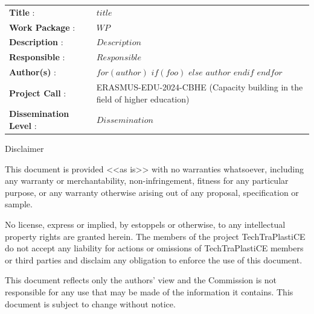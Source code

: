 \vfill


\begin{tabu} to \linewidth {X[1,l]  | X[3.5,l]}
  \toprule
  \textbf{Title} : & $title$  \\ 
  \textbf{Work Package} : & $WP$  \\ 
  \textbf{Description} : & $Description$  \\ 
  \textbf{Responsible} : & $Responsible$  \\ 
  \textbf{Author(s)} : &  
  $for(author)$ 
    $if(foo)$
    \newline
    $else$
    $author$
    $endif$
   $endfor$  \\ 
  \textbf{Project Call} : & ERASMUS-EDU-2024-CBHE (Capacity building in the field of higher education)  \\ 
  \textbf{Dissemination Level} : & $Dissemination$\\   
\bottomrule
\end{tabu}



\vfill




  
  
  \vfill
  
  {\scriptsize\centering\color{lightgray} 
  
  Disclaimer
  
  This document is provided <<as is>> with no warranties whatsoever, 
  including any warranty or merchantability, non-infringement, fitness for any particular 
  purpose, or any warranty otherwise arising out of any proposal, specification or sample.  
  
  No license, express or implied, by estoppels or otherwise, to any intellectual 
  property rights are granted herein. 
  The members of the project TechTraPlastiCE do not accept any liability for actions or 
  omissions of TechTraPlastiCE members or third parties and disclaim any obligation 
  to enforce the use of this document. 
  
  This document reflects only the authors' view and the Commission is not responsible 
  for any use that may be made of the information it contains.  
  This document is subject to change without notice. 
  
  }
  \normalsize
  
  
  
  